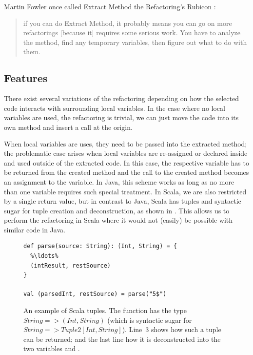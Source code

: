 \documentclass[10pt,a4paper,oneside]{scrreprt}
\begin{document}
Martin Fowler once called Extract Method the Refactoring's Rubicon \cite{FowlerRubicon}: 

\begin{quotation}
if you can do Extract Method, it probably means you can go on more refactorings [because it] requires some serious work. You have to analyze the method, find any temporary variables, then figure out what to do with them.
\end{quotation} 

\subsection{Features}

There exist several variations of the refactoring depending on how the selected code interacts with surrounding local variables. In the case where no local variables are used, the refactoring is trivial, we can just move the code into its own method and insert a call at the origin. 

When local variables are uses, they need to be passed into the extracted method; the problematic case arises when local variables are re-assigned or declared inside and used outside of the extracted code. In this case, the respective variable has to be returned from the created method and the call to the created method becomes an assignment to the variable. In Java, this scheme works as long as no more than one variable requires such special treatment. In Scala, we are also restricted by a single return value, but in contrast to Java, Scala has tuples and syntactic sugar for tuple creation and deconstruction, as shown in . This allows us to perform the refactoring in Scala where it would not (easily) be possible with similar code in Java.

\begin{figure}
\begin{lstlisting}
def parse(source: String): (Int, String) = {
  %\ldots%
  (intResult, restSource)
}

val (parsedInt, restSource) = parse("5$")
\end{lstlisting}

\caption{An example of Scala tuples. The function  has the type $String => (Int, String)$ (which is syntactic sugar for $String => Tuple2[Int, String]$). Line~3 shows how such a tuple can be returned; and the last line how it is deconstructed into the two variables  and .}
\label{figure:tuple-deconstruction}
\end{figure}
\end{document}
